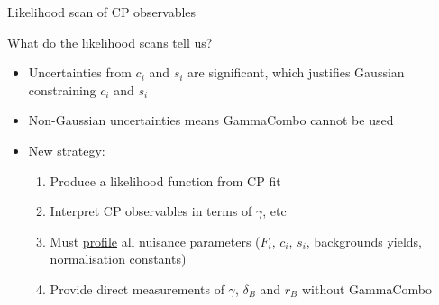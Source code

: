 \documentclass{beamer}
\begin{document}
\begin{frame}{Likelihood scan of CP observables}
  \begin{center}
    {\large What do the likelihood scans tell us?}
  \end{center}
  \begin{itemize}
    \setlength\itemsep{1.5em}
    \item{Uncertainties from $c_i$ and $s_i$ are significant, which justifies Gaussian constraining $c_i$ and $s_i$}
    \item{Non-Gaussian uncertainties means GammaCombo cannot be used}
    \item{New strategy:}
    \begin{enumerate}
      \setlength\itemsep{0.5em}
      \item{Produce a likelihood function from CP fit}
      \item{Interpret CP observables in terms of $\gamma$, etc}
      \item{Must \underline{profile} all nuisance parameters ($F_i$, $c_i$, $s_i$, backgrounds yields, normalisation constants)}
      \item{Provide direct measurements of $\gamma$, $\delta_B$ and $r_B$ without GammaCombo}
    \end{enumerate}
  \end{itemize}
\end{frame}
\end{document}
